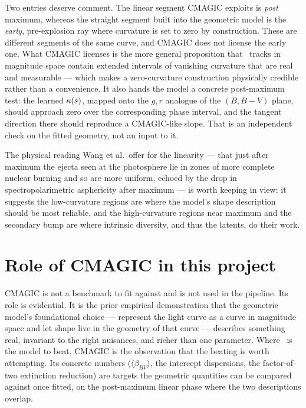 \documentclass[11pt]{article}
\begin{document}
Two entries deserve comment. The linear segment CMAGIC exploits is \emph{post}
maximum, whereas the straight segment built into the geometric model is the
\emph{early}, pre-explosion ray where curvature is set to zero by construction. These
are different segments of the same curve, and CMAGIC does not license the early one.
What CMAGIC licenses is the more general proposition that \snia\ tracks in magnitude
space contain extended intervals of vanishing curvature that are real and measurable
--- which makes a zero-curvature construction physically credible rather than a
convenience. It also hands the model a concrete post-maximum test: the learned
$\kappa(s)$, mapped onto the $g,r$ analogue of the $(B,B-V)$ plane, should approach
zero over the corresponding phase interval, and the tangent direction there should
reproduce a CMAGIC-like slope. That is an independent check on the fitted geometry,
not an input to it.

The physical reading Wang et al.\ offer for the linearity --- that just after maximum
the ejecta seen at the photosphere lie in zones of more complete nuclear burning and
so are more uniform, echoed by the drop in spectropolarimetric asphericity after
maximum --- is worth keeping in view: it suggests the low-curvature regions are where
the model's shape description should be most reliable, and the high-curvature regions
near maximum and the secondary bump are where intrinsic diversity, and thus the
latents, do their work.

\section{Role of CMAGIC in this project}

CMAGIC is not a benchmark to fit against and is not used in the pipeline. Its role is
evidential. It is the prior empirical demonstration that the geometric model's
foundational choice --- represent the light curve as a curve in magnitude space and
let shape live in the geometry of that curve --- describes something real, invariant
to the right nuisances, and richer than one parameter. Where \salt\ is the model to
beat, CMAGIC is the observation that the beating is worth attempting. Its concrete
numbers ($\langle\beta_{BV}\rangle$, the intercept dispersions, the factor-of-two
extinction reduction) are targets the geometric quantities can be compared against
once fitted, on the post-maximum linear phase where the two descriptions overlap.



\end{document}
